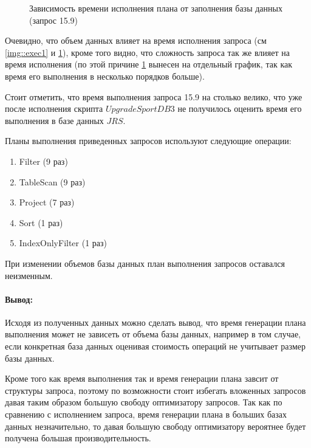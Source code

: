 \documentclass[a4paper,12pt]{article}
\begin{document}
\begin{figure}[h]
	\noindent{}
	\caption{Зависимость времени исполнения плана от заполнения базы данных (запрос 15.9)}
	\label{img::exec2}
\end{figure}

Очевидно, что объем данных влияет на время исполнения запроса (см \ref{img::exec1} и \ref{img::exec2}), кроме того видно,
что сложность запроса так же влияет на время исполнения (по этой причине \ref{img::exec2} вынесен на отдельный график, так
как время его выполнения в несколько порядков больше).

Стоит отметить, что время выполнения запроса 15.9 на столько велико, что уже после исполнения скрипта $UpgradeSportDB3$
не получилось оценить время его выполнения в базе данных $JRS$.

Планы выполнения приведенных запросов используют следующие операции:
\begin{enumerate}
\item Filter (9 раз)

\item TableScan (9 раз)

\item Project (7 раз)

\item Sort (1 раз)

\item IndexOnlyFilter (1 раз)
\end{enumerate}

При изменении объемов базы данных план выполнения запросов оставался неизменным.

\paragraph{Вывод:}

Исходя из полученных данных можно сделать вывод, что время генерации плана выполнения может не зависеть
от объема базы данных, например в том случае, если конкретная база данных оценивая стоимость операций не учитывает размер
базы данных.

Кроме того как время выполнения так и время генерации плана завсит от структуры запроса, поэтому по возможности стоит избегать
вложенных запросов давая таким образом большую свободу оптимизатору запросов. Так как по сравнению с исполнением запроса, время
генерации плана в больших базах данных незначительно, то давая большую свободу оптимизатору вероятнее будет получена большая
производительность.
\end{document}
